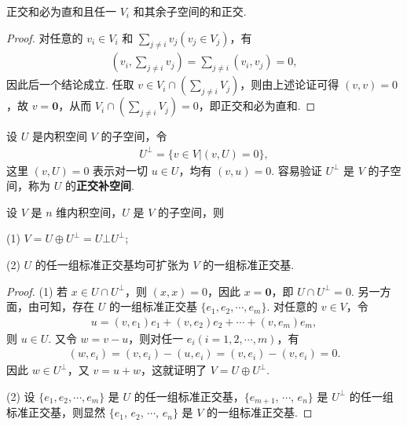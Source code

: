 \documentclass[../../main.tex]{subfiles}
\begin{document}
\begin{lemma}\label{lemma:正交和必为直和}
正交和必为直和且任一 $V_i$ 和其余子空间的和正交.
\end{lemma}
\begin{proof}
对任意的 $v_i \in V_i$ 和 $\sum_{j \neq i}v_j (v_j \in V_j)$，有
\begin{align*}
(v_i, \sum_{j \neq i}v_j) = \sum_{j \neq i}(v_i, v_j) = 0,
\end{align*}
因此后一个结论成立. 任取 $v \in V_i \cap (\sum_{j \neq i}V_j)$，则由上述论证可得 $(v, v) = 0$，故 $v = \mathbf{0}$，从而 $V_i \cap (\sum_{j \neq i}V_j) = 0$，即正交和必为直和.
\end{proof}

\begin{definition}[正交补空间]\label{definition:正交补空间}
设 $U$ 是内积空间 $V$ 的子空间，令
\begin{align*}
U^\perp = \{v \in V | (v, U) = 0\},
\end{align*}
这里 $(v, U) = 0$ 表示对一切 $u \in U$，均有 $(v, u) = 0$. 容易验证 $U^\perp$ 是 $V$ 的子空间，称为 $U$ 的\textbf{正交补空间}.
\end{definition}

\begin{theorem}
设 $V$ 是 $n$ 维内积空间，$U$ 是 $V$ 的子空间，则

(1) $V = U \oplus U^\perp=U\bot U^{\bot}$;

(2) $U$ 的任一组标准正交基均可扩张为 $V$ 的一组标准正交基.
\end{theorem}
\begin{proof}
(1) 若 $x \in U \cap U^\perp$，则 $(x, x) = 0$，因此 $x = \mathbf{0}$，即 $U \cap U^\perp = 0$. 另一方面，由可知，存在 $U$ 的一组标准正交基 $\{e_1, e_2, \cdots, e_m\}$. 对任意的 $v \in V$，令
\begin{align*}
u = (v, e_1)e_1 + (v, e_2)e_2 + \cdots + (v, e_m)e_m,
\end{align*}
则 $u \in U$. 又令 $w = v - u$，则对任一 $e_i (i = 1, 2, \cdots, m)$，有
\begin{align*}
(w, e_i) = (v, e_i) - (u, e_i) = (v, e_i) - (v, e_i) = 0.
\end{align*}
因此 $w \in U^\perp$，又 $v = u + w$，这就证明了 $V = U \oplus U^\perp$.

(2) 设 $\{e_1, e_2, \cdots, e_m\}$ 是 $U$ 的任一组标准正交基，$\{e_{m + 1}$, $\cdots$, $e_n\}$ 是 $U^\perp$ 的任一组标准正交基，则显然 $\{e_1$, $e_2$, $\cdots$, $e_n\}$ 是 $V$ 的一组标准正交基. 
\end{proof}
\end{document}

